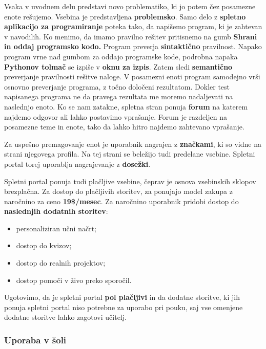 Vsaka v uvodnem delu predstavi novo problematiko, ki jo potem čez
posamezne enote rešujemo. Vsebina je predstavljena
\textbf{problemsko}. Samo delo z \textbf{spletno aplikacijo za
  programiranje} poteka tako, da napišemo program, ki je zahtevan v
navodilih. Ko menimo, da imamo pravilno rešitev pritisnemo na gumb
\textbf{Shrani in oddaj programsko kodo.} Program preverja
\textbf{sintaktično} pravilnost. Napako program vrne nad gumbom za
oddajo programske kode, podrobna napaka \textbf{Pythonov tolmač} se
izpiše v \textbf{oknu za izpis}. Zatem sledi \textbf{semantično}
preverjanje pravilnosti rešitve naloge. V posamezni enoti program
samodejno vrši osnovno preverjanje programa, z točno določeni
rezultatom. Dokler test napisanega programa ne da pravega rezultata me
moremo nadaljevati na naslednjo enoto. Ko se nam zatakne, spletna
stran ponuja \textbf{forum} na katerem najdemo odgovor ali lahko
postavimo vprašanje. Forum je razdeljen na posamezne teme in enote,
tako da lahko hitro najdemo zahtevano vprašanje.

Za uspešno premagovanje enot je uporabnik nagrajen z
\textbf{značkami}, ki so vidne na strani njegovega profila. Na tej
strani se beležijo tudi predelane vsebine. Spletni portal torej
uporablja nagrajevanje z \textbf{dosežki}.

Spletni portal ponuja tudi plačljive vsebine, čeprav je osnova
vsebinskih sklopov brezplačna. Za dostop do plačljivih storitev, za
ponujajo model zakupa z naročnino za ceno \textbf{19\$/mesec}. Za
naročnino uporabnik pridobi dostop do\textbf{ naslednjih dodatnih
  storitev}:

\begin{itemize}
\item personaliziran učni načrt;
\item dostop do kvizov;
\item dostop do realnih projektov;
\item dostop pomoči v živo preko sporočil.
\end{itemize}

Ugotovimo, da je spletni portal \textbf{pol plačljivi} in da dodatne
storitve, ki jih ponuja spletni portal niso potrebne za uporabo pri
pouku, saj vse omenjene dodatne storitve lahko zagotovi učitelj.

\subsubsection{Uporaba v šoli}
\label{sec:uporaba_v_soli}

